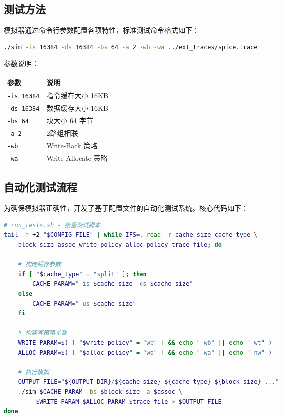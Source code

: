 \documentclass[12pt,a4paper]{article}
\begin{document}
\subsection{测试方法}

模拟器通过命令行参数配置各项特性，标准测试命令格式如下：

\begin{lstlisting}[language=bash]
./sim -is 16384 -ds 16384 -bs 64 -a 2 -wb -wa ../ext_traces/spice.trace
\end{lstlisting}

参数说明：

\begin{table}[H]
\centering
\small
\begin{tabular}{lp{10cm}}
\toprule
\textbf{参数} & \textbf{说明} \\
\midrule
\texttt{-is 16384} & 指令缓存大小 16KB \\
\texttt{-ds 16384} & 数据缓存大小 16KB \\
\texttt{-bs 64} & 块大小 64 字节 \\
\texttt{-a 2} & 2路组相联 \\
\texttt{-wb} & Write-Back 策略 \\
\texttt{-wa} & Write-Allocate 策略 \\
\bottomrule
\end{tabular}
\end{table}

\subsection{自动化测试流程}

为确保模拟器正确性，开发了基于配置文件的自动化测试系统。核心代码如下：

\begin{lstlisting}[language=bash]
# run_tests.sh - 批量测试脚本
tail -n +2 "$CONFIG_FILE" | while IFS=, read -r cache_size cache_type \
    block_size assoc write_policy alloc_policy trace_file; do
    
    # 构建缓存参数
    if [ "$cache_type" = "split" ]; then
        CACHE_PARAM="-is $cache_size -ds $cache_size"
    else
        CACHE_PARAM="-us $cache_size"
    fi
    
    # 构建写策略参数
    WRITE_PARAM=$( [ "$write_policy" = "wb" ] && echo "-wb" || echo "-wt" )
    ALLOC_PARAM=$( [ "$alloc_policy" = "wa" ] && echo "-wa" || echo "-nw" )
    
    # 执行模拟
    OUTPUT_FILE="${OUTPUT_DIR}/${cache_size}_${cache_type}_${block_size}_..."
    ./sim $CACHE_PARAM -bs $block_size -a $assoc \
         $WRITE_PARAM $ALLOC_PARAM $trace_file > $OUTPUT_FILE
done
\end{lstlisting}
\end{document}
